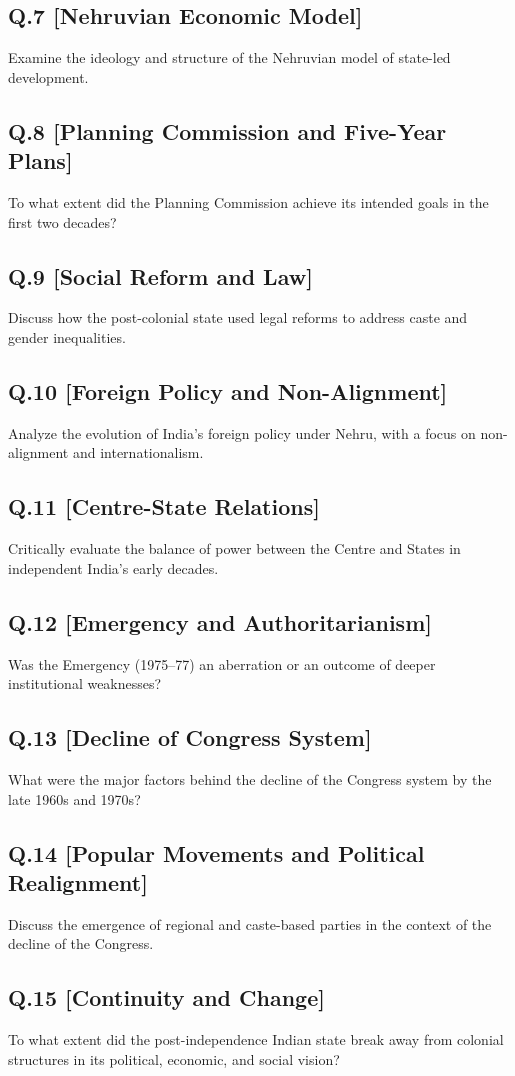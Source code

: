 \subsection*{Q.7 [Nehruvian Economic Model]}
Examine the ideology and structure of the Nehruvian model of state-led development.

\subsection*{Q.8 [Planning Commission and Five-Year Plans]}
To what extent did the Planning Commission achieve its intended goals in the first two decades?

\subsection*{Q.9 [Social Reform and Law]}
Discuss how the post-colonial state used legal reforms to address caste and gender inequalities.

\subsection*{Q.10 [Foreign Policy and Non-Alignment]}
Analyze the evolution of India’s foreign policy under Nehru, with a focus on non-alignment and internationalism.

\subsection*{Q.11 [Centre-State Relations]}
Critically evaluate the balance of power between the Centre and States in independent India’s early decades.

\subsection*{Q.12 [Emergency and Authoritarianism]}
Was the Emergency (1975–77) an aberration or an outcome of deeper institutional weaknesses?

\subsection*{Q.13 [Decline of Congress System]}
What were the major factors behind the decline of the Congress system by the late 1960s and 1970s?

\subsection*{Q.14 [Popular Movements and Political Realignment]}
Discuss the emergence of regional and caste-based parties in the context of the decline of the Congress.

\subsection*{Q.15 [Continuity and Change]}
To what extent did the post-independence Indian state break away from colonial structures in its political, economic, and social vision?
